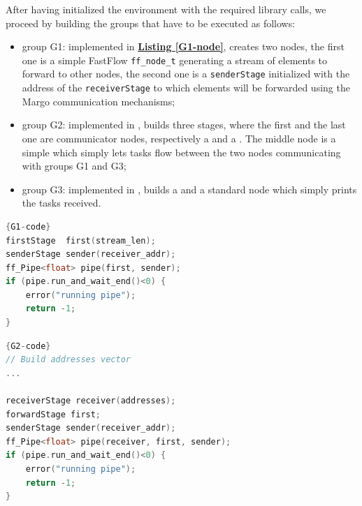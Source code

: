 After having initialized the environment with the required library calls, we proceed by building the groups that have to be executed as follows:
\begin{itemize}
    \item group G1: implemented in \hyperref[G1-node]{\textbf{Listing \ref{G1-node}}}, creates two nodes, the first one is a simple FastFlow \texttt{ff\_node\_t} generating a stream of elements to forward to other nodes, the second one is a \texttt{senderStage} initialized with the address of the \texttt{receiverStage} to which elements will be forwarded using the Margo communication mechanisms;
    \item group G2: implemented in , builds three stages, where the first and the last one are communicator nodes, respectively a  and a . The middle node is a simple  which simply lets tasks flow between the two nodes communicating with groups G1 and G3;
    \item group G3: implemented in , builds a  and a standard  node which simply prints the tasks received.
\end{itemize}

\begin{center}
\begin{minipage}{.45\textwidth}
\begin{lstlisting}[caption=G1 node composition,language=C++, style=mystyle, label=G1-node]{G1-code}
firstStage  first(stream_len);
senderStage sender(receiver_addr);
ff_Pipe<float> pipe(first, sender);
if (pipe.run_and_wait_end()<0) {
    error("running pipe");
    return -1;
}
\end{lstlisting}
\end{minipage}\hfill    
\end{center}

\begin{center}
\begin{minipage}{.63\textwidth}
\begin{lstlisting}[caption=G2 node composition,language=C++, style=mystyle, label=G2-node]{G2-code}
// Build addresses vector
...

receiverStage receiver(addresses);
forwardStage first;
senderStage sender(receiver_addr);
ff_Pipe<float> pipe(receiver, first, sender);
if (pipe.run_and_wait_end()<0) {
    error("running pipe");
    return -1;
}
\end{lstlisting}
\end{minipage}
\end{center}

